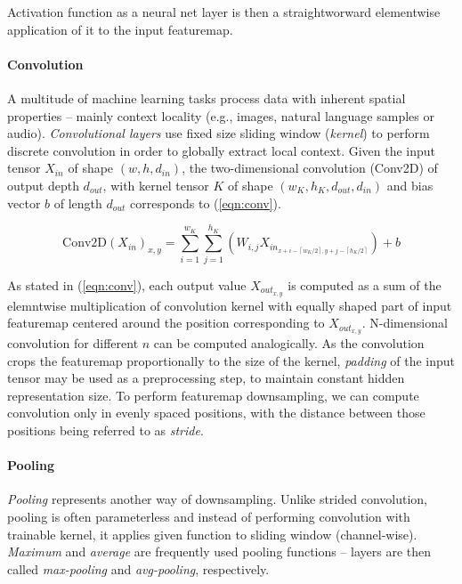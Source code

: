 \noindent Activation function as a neural net layer is then a straightworward elementwise application of it to the input featuremap.

\paragraph{Convolution}
A multitude of machine learning tasks process data with inherent spatial properties -- mainly context locality (e.g., images, natural language samples or audio). \emph{Convolutional layers} use fixed size sliding window (\emph{kernel}) to perform discrete convolution in order to globally extract local context. Given the input tensor $X_{in}$ of shape $(w, h, d_{in})$, the two-dimensional convolution (Conv2D) of output depth $d_{out}$, with kernel tensor $K$ of shape $(w_K, h_K, d_{out}, d_{in})$ and bias vector $b$ of length $d_{out}$ corresponds to (\ref{eqn:conv}).

\begin{equation} \label{eqn:conv}
\text{Conv2D}(X_{in})_{x, y} =
    \sum\limits_{i=1}^{w_K}
    \sum\limits_{j=1}^{h_K}
    \left(W_{i,j} X_{in_{x + i - \left\lceil w_K / 2 \right\rceil, y + j - \left\lceil h_K / 2 \right\rceil}}\right) + b
\end{equation}

\noindent As stated in (\ref{eqn:conv}), each output value $X_{out_{x, y}}$ is computed as a sum of the elemntwise multiplication of convolution kernel with equally shaped part of input featuremap centered around the position corresponding to $X_{out_{x, y}}$. N-dimensional convolution for different $n$ can be computed analogically. As the convolution crops the featuremap proportionally to the size of the kernel, \emph{padding} of the input tensor may be used as a preprocessing step, to maintain constant hidden representation size. To perform featuremap downsampling, we can compute convolution only in evenly spaced positions, with the distance between those positions being referred to as \emph{stride}.

\paragraph{Pooling}
\emph{Pooling} represents another way of downsampling. Unlike strided convolution, pooling is often parameterless and instead of performing convolution with trainable kernel, it applies given function to sliding window (channel-wise). \emph{Maximum} and \emph{average} are frequently used pooling functions -- layers are then called \emph{max-pooling} and \emph{avg-pooling}, respectively.

